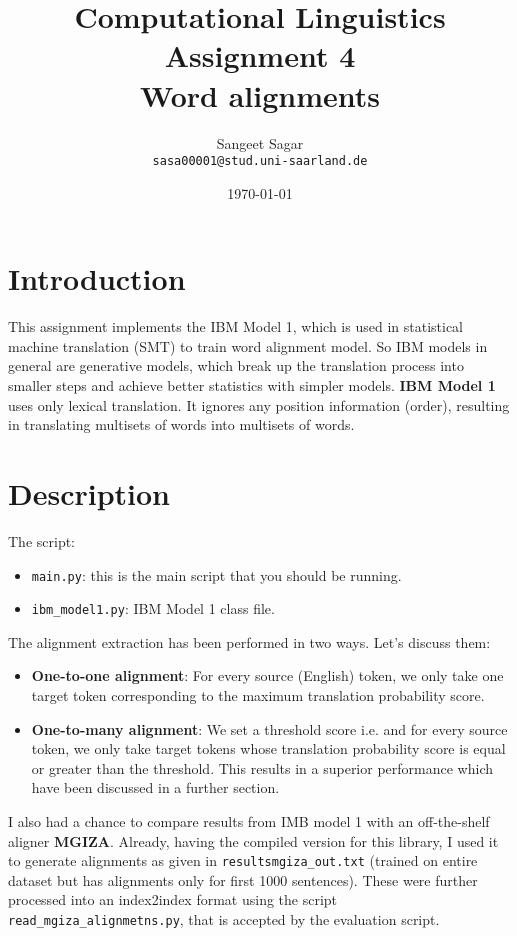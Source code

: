\documentclass{article}[a4paper]
\title{\textbf{Computational Linguistics} \\
Assignment 4\\
Word alignments 
}
\author{Sangeet Sagar\\
            \texttt{sasa00001@stud.uni-saarland.de}
}
\date{\today}
\begin{document}
\maketitle
\section{Introduction}
This assignment implements the IBM Model 1, which is used in statistical machine translation (SMT) to train word alignment model. So IBM models in general are generative models, which break up the translation process into smaller steps and achieve better statistics with simpler models.
\textbf{IBM Model 1} uses only lexical translation. It ignores any position information (order), resulting in translating multisets of words into multisets of words.

\section{Description}
The script:
\begin{itemize}
    \item \texttt{main.py}: this is the main script that you should be running.
    \item \texttt{ibm\_model1.py}: IBM Model 1 class file.
\end{itemize}

The alignment extraction has been performed in two ways. Let's discuss them:
\begin{itemize}
    \item \textbf{One-to-one alignment}: For every source (English) token, we only take one target token corresponding to the maximum translation probability score.
    \item \textbf{One-to-many alignment}: We set a threshold score i.e.  and for every source token, we only take target tokens whose translation probability score is equal or greater than the threshold. This results in a superior performance which have been discussed in a further section.
\end{itemize}
I also had a chance to compare results from IMB model 1 with an off-the-shelf aligner \textbf{MGIZA}. Already, having the compiled version for this library, I used it to generate alignments as given in \texttt{results\/mgiza\_out.txt} (trained on entire dataset but has  alignments only for first 1000 sentences). These were further processed into an index2index format using the script \texttt{read\_mgiza\_alignmetns.py}, that is accepted by the evaluation script.
\end{document}
